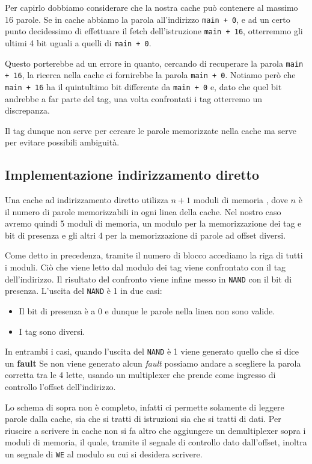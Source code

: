 Per capirlo dobbiamo considerare che la nostra cache può contenere al massimo 16 parole. Se in
cache abbiamo la parola all'indirizzo \verb|main + 0|, e ad un certo punto decidessimo di
effettuare il fetch dell'istruzione \verb|main + 16|, otterremmo gli ultimi 4 bit uguali a quelli
di \verb|main + 0|.

Questo porterebbe ad un errore in quanto, cercando di recuperare la parola \verb|main + 16|, la
ricerca nella cache ci fornirebbe la parola \verb|main + 0|. Notiamo però che \verb|main + 16| ha
il quintultimo bit differente da \verb|main + 0| e, dato che quel bit andrebbe a far parte del tag,
una volta confrontati i tag otterremo un discrepanza.

Il tag dunque non serve per cercare le parole memorizzate nella cache ma serve per evitare possibili
ambiguità.

\subsection{Implementazione indirizzamento diretto}
Una cache ad indirizzamento diretto utilizza $n+1$ moduli di memoria , dove $n$ è il numero di
parole memorizzabili in ogni linea della cache. Nel nostro caso avremo quindi 5 moduli di memoria,
un modulo per la memorizzazione dei tag e bit di presenza e gli altri 4 per la memorizzazione di
parole ad offset diversi.
\begin{center}
	
\end{center}
Come detto in precedenza, tramite il numero di blocco accediamo la riga di tutti i moduli. Ciò che
viene letto dal modulo dei tag viene confrontato con il tag dell'indirizzo. Il risultato del
confronto viene infine messo in \verb|NAND| con il bit di presenza. L'uscita del \verb|NAND| è 1
in due casi:
\begin{itemize}
	\item Il bit di presenza è a 0 e dunque le parole nella linea non sono valide.
	\item I tag sono diversi.
\end{itemize}
In entrambi i casi, quando l'uscita del \verb|NAND| è 1 viene generato quello che si dice un
\textbf{fault}
Se non viene generato alcun \emph{fault} possiamo andare a scegliere la parola corretta tra le 4
lette, usando un multiplexer che prende come ingresso di controllo l'offset dell'indirizzo.

Lo schema di sopra non è completo, infatti ci permette solamente di leggere parole dalla cache, sia
che si tratti di istruzioni sia che si tratti di dati. Per riuscire a scrivere in cache non si fa
altro che aggiungere un demultiplexer sopra i moduli di memoria, il quale, tramite il segnale di
controllo dato dall'offset, inoltra un segnale di \verb|WE| al modulo su cui si desidera scrivere.
